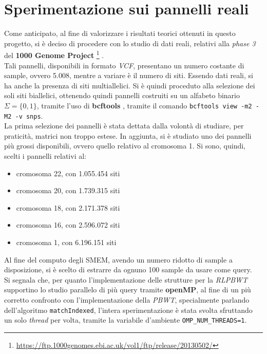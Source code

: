 \section{Sperimentazione sui pannelli reali}
Come anticipato, al fine di valorizzare i risultati teorici ottenuti in
questo progetto, si 
è deciso di procedere con lo studio di dati reali, relativi alla \textit{phase
  3} del \textbf{1000 Genome Project}
\footnote{\url{https://ftp.1000genomes.ebi.ac.uk/vol1/ftp/release/20130502/}}
\cite{1kgp}.\\ 
Tali pannelli, disponibili in formato \textit{VCF}, presentano un numero
costante di sample, ovvero 5.008, mentre a variare è il numero di siti. Essendo
dati reali, si ha anche la presenza di siti multiallelici. Si è quindi proceduto
alla selezione dei soli siti biallelici, ottenendo quindi pannelli costruiti su
un alfabeto binario $\Sigma=\{0,1\}$, tramite l'uso di \textbf{bcftools}
\cite{bcftools}, tramite il comando \texttt{bcftools view -m2 -M2
  -v snps}.\\
La prima selezione dei pannelli è stata dettata dalla volontà di studiare, per
praticità, matrici non troppo estese. In aggiunta, si è studiato uno dei
pannelli più grossi disponibili, ovvero quello relativo al cromosoma 1. Si sono,
quindi, scelti i pannelli relativi al:
\begin{itemize}
  \item cromosoma 22, con 1.055.454 siti
  \item cromosoma 20, con 1.739.315 siti
  \item cromosoma 18, con 2.171.378 siti
  \item cromosoma 16, con 2.596.072 siti
  \item cromosoma 1, con 6.196.151 siti
\end{itemize}
Al fine del computo degli SMEM, avendo un numero ridotto di sample a
disposizione, si è scelto di estrarre da ognuno 100 sample da usare come
query.\\
Si segnala che, per quanto l'implementazione delle strutture per la
\textit{RLPBWT} supportino lo studio parallelo di più query tramite
\textbf{openMP}\cite{openmp}, al fine di un più 
corretto confronto con l'implementazione della \textit{PBWT}, specialmente
parlando dell'algoritmo \texttt{matchIndexed}, l'intera sperimentazione è stata
svolta sfruttando un solo \textit{thread} per volta, tramite la variabile
d'ambiente \texttt{OMP\_NUM\_THREADS=1}.
